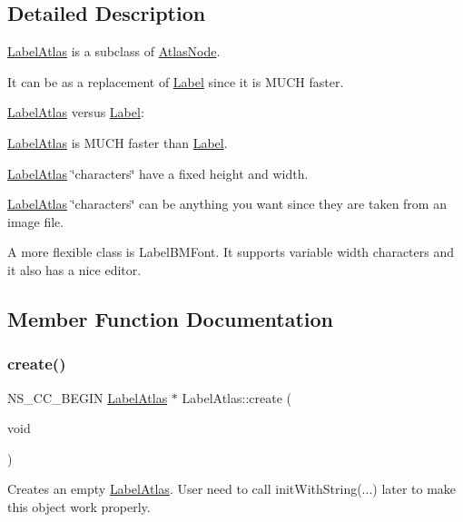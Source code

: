 \subsection{Detailed Description}
\hyperlink{classLabelAtlas}{Label\+Atlas} is a subclass of \hyperlink{classAtlasNode}{Atlas\+Node}. 

It can be as a replacement of \hyperlink{classLabel}{Label} since it is M\+U\+CH faster.

\hyperlink{classLabelAtlas}{Label\+Atlas} versus \hyperlink{classLabel}{Label}\+:
\begin{DoxyItemize}
\item \hyperlink{classLabelAtlas}{Label\+Atlas} is M\+U\+CH faster than \hyperlink{classLabel}{Label}.
\item \hyperlink{classLabelAtlas}{Label\+Atlas} \char`\"{}characters\char`\"{} have a fixed height and width.
\item \hyperlink{classLabelAtlas}{Label\+Atlas} \char`\"{}characters\char`\"{} can be anything you want since they are taken from an image file.
\end{DoxyItemize}

A more flexible class is Label\+B\+M\+Font. It supports variable width characters and it also has a nice editor. 

\subsection{Member Function Documentation}
\mbox{\label{classLabelAtlas_a429e8c4158fef988031fd9e45e759268}} 
\subsubsection{\texorpdfstring{create()}{create()}\hspace{0.1cm}{\footnotesize\ttfamily [1/6]}}
{\footnotesize\ttfamily N\+S\+\_\+\+C\+C\+\_\+\+B\+E\+G\+IN \hyperlink{classLabelAtlas}{Label\+Atlas} $\ast$ Label\+Atlas\+::create (\begin{DoxyParamCaption}\item[{void}]{ }\end{DoxyParamCaption})\hspace{0.3cm}{\ttfamily [static]}}

Creates an empty \hyperlink{classLabelAtlas}{Label\+Atlas}. User need to call init\+With\+String(...) later to make this object work properly. \mbox{\label{classLabelAtlas_af818d41292b936db1441d172b5d8cf35}} 
